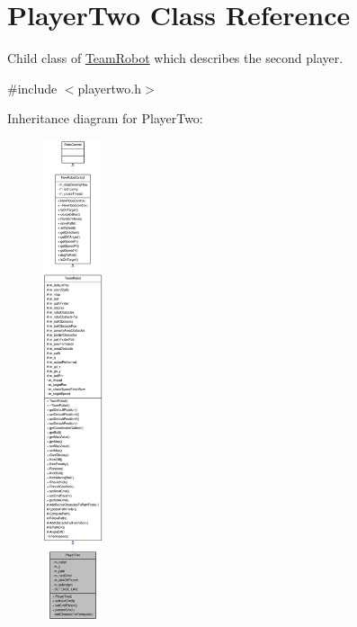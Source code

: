 \hypertarget{classPlayerTwo}{
\section{PlayerTwo Class Reference}
\label{classPlayerTwo}
}


Child class of \hyperlink{classTeamRobot}{TeamRobot} which describes the second player.  




{\ttfamily \#include $<$playertwo.h$>$}



Inheritance diagram for PlayerTwo:\nopagebreak
\begin{figure}[H]
\begin{center}
\leavevmode
\includegraphics[height=400pt]{classPlayerTwo__inherit__graph}
\end{center}
\end{figure}
